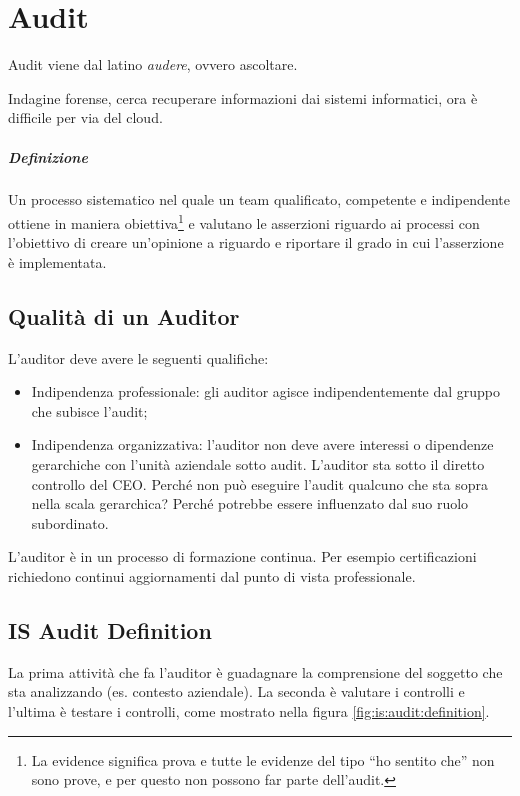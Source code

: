 \chapter{Audit}
\label{audit}

Audit viene dal latino \textit{audere}, ovvero ascoltare.

Indagine forense, cerca recuperare informazioni dai sistemi informatici, ora è 
difficile per via del cloud.

\paragraph*{Definizione}

Un processo sistematico nel quale un team qualificato, competente e 
indipendente ottiene in maniera obiettiva\footnote{La evidence significa prova e 
tutte le evidenze del tipo ``ho sentito che'' non sono prove, e per questo non 
possono far parte dell'audit.} e valutano le asserzioni riguardo ai processi 
con l'obiettivo di creare un'opinione a riguardo e riportare il grado in cui 
l'asserzione è implementata.


\section{Qualità di un Auditor}

L'auditor deve avere le seguenti qualifiche:
\begin{itemize}
\item Indipendenza professionale: gli auditor agisce indipendentemente dal 
gruppo che subisce l'audit;
\item Indipendenza organizzativa: l'auditor non deve avere interessi o dipendenze 
gerarchiche con l'unità aziendale sotto audit. L'auditor sta sotto il diretto 
controllo del CEO. Perché non può eseguire l'audit qualcuno che sta sopra nella 
scala gerarchica? Perché potrebbe essere influenzato dal suo ruolo subordinato.
\end{itemize}

L'auditor è in un processo di formazione continua. Per esempio certificazioni 
richiedono continui aggiornamenti dal punto di vista professionale.

\section{IS Audit Definition}

La prima attività che fa l'auditor è guadagnare la comprensione del soggetto 
che sta analizzando (es. contesto aziendale).
La seconda è valutare i controlli e l'ultima è testare i controlli, come 
mostrato nella figura \ref{fig:is:audit:definition}.


